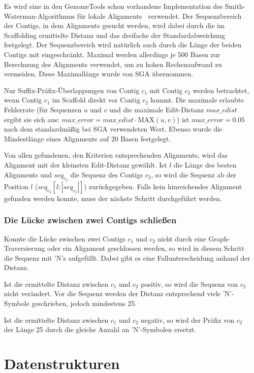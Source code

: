 \documentclass[a4paper,10pt,parskip]{scrartcl}
\begin{document}
Es wird eine in den GenomeTools schon vorhandene Implementation des
Smith-Waterman-Algorithmus für lokale Alignments~\cite{smith}
verwendet. Der Sequenzbereich der Contigs, in dem Alignments gesucht
werden, wird dabei durch die im Scaffolding ermittelte Distanz und das
dreifache der Standardabweichung festgelegt. Der Sequenzbereich wird
natürlich auch durch die Länge der beiden Contigs mit
eingeschränkt. Maximal werden allerdings je 500 Basen zur
Berechnung des Alignments verwendet, um zu hohen Rechenaufwand zu
vermeiden. Diese Maximallänge wurde von SGA übernommen.

Nur Suffix-Präfix-Überlappungen von Contig $c_1$ mit Contig $c_2$
werden betrachtet, wenn Contig $c_1$ im Scaffold direkt vor Contig
$c_2$ kommt. Die maximale erlaubte Fehlerrate (für Sequenzen $u$ und
$v$ und die maximale Edit-Distanz $max\_edist$ ergibt sie sich aus:
$max\_error = max\_edist \cdot \text{MAX}(u,v)$) ist $max\_error =
0.05$ nach dem standardmäßig bei SGA verwendeten Wert. Ebenso wurde
die Mindestlänge eines Alignments auf 20 Basen festgelegt.

Von allen gefundenen, den Kriterien entsprechenden Alignments, wird das
Alignment mit der kleinsten Edit-Distanz gewählt. Ist $l$ die Länge
des besten Alignments und $seq_{c_2}$ die Sequenz des Contigs $c_2$,
so wird die Sequenz ab der Position $l$ ($seq_{c_2}[l:|seq_{c_2}|]$)
zurückgegeben. Falls kein hinreichendes Alignment gefunden werden
konnte, muss der nächste Schritt durchgeführt werden.

\subsubsection{Die Lücke zwischen zwei Contigs schließen}
Konnte die Lücke zwischen zwei Contigs $c_1$ und $c_2$ nicht durch
eine Graph-Traversierung oder ein Alignment geschlossen werden, so wird
in diesem Schritt die Sequenz mit 'N's aufgefüllt. Dabei gibt es eine
Fallunterscheidung anhand der Distanz.

Ist die ermittelte Distanz zwischen $c_1$ und $c_2$ positiv, so wird
die Sequenz von $c_2$ nicht verändert. Vor die Sequenz werden der
Distanz entsprechend viele 'N'-Symbole geschrieben, jedoch mindestens
25.

Ist die ermittelte Distanz zwischen $c_1$ und $c_2$ negativ, so wird
der Präfix von $c_2$ der Länge 25 durch die gleiche Anzahl an
'N'-Symbolen ersetzt.

\section{Datenstrukturen}
\label{sec: Datenstrukturen}
\end{document}
